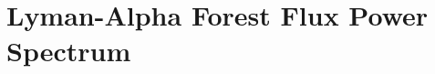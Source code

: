 \documentclass[a4paper,11pt]{article}
\newcommand{\Lya}{Lyman-$\alpha$}
\begin{document}


\section{Lyman-Alpha Forest Flux Power Spectrum}
\label{sec:lymanalpha}

\end{document}
